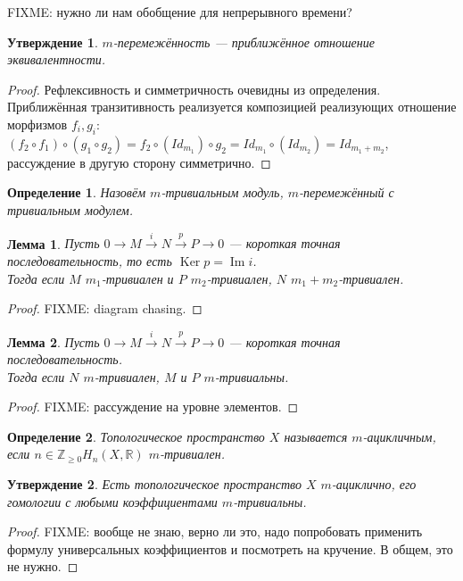 \documentclass[a4paper,12pt]{report}
\newtheorem{lemma}{Лемма}
\newtheorem{claim}{Утверждение}
\newtheorem{definition}{Определение}
\begin{document}
FIXME: нужно ли нам обобщение для непрерывного времени?
\begin{claim}
  $m$-перемежённость --- приближённое отношение эквивалентности.
\end{claim}
\begin{proof}
  Рефлексивность и симметричность очевидны из определения.\\
  Приближённая транзитивность реализуется композицией реализующих отношение морфизмов $f_i, g_i$:\\
  $(f_2 \circ f_1) \circ (g_1 \circ g_2) = f_2 \circ (Id_{m_1}) \circ g_2 = Id_{m_1} \circ (Id_{m_2}) = Id_{m_1 + m_2}$, рассуждение в другую сторону симметрично.
\end{proof}
\begin{definition}
  Назовём $m$-тривиальным модуль, $m$-перемежённый с тривиальным модулем.
\end{definition}
\begin{lemma}
  Пусть $0 \to M \xrightarrow{i} N \xrightarrow{p} P \to 0$ --- короткая точная последовательность, то есть $\operatorname{Ker}p = \operatorname{Im}i$.\\
  Тогда если $M$ $m_1$-тривиален и $P$ $m_2$-тривиален, $N$ $m_1 + m_2$-тривиален.
\end{lemma}
\begin{proof}
  FIXME: diagram chasing.
\end{proof}
\begin{lemma}
  Пусть $0 \to M \xrightarrow{i} N \xrightarrow{p} P \to 0$ --- короткая точная последовательность.\\
  Тогда если $N$ $m$-тривиален, $M$ и $P$ $m$-тривиальны.
\end{lemma}
\begin{proof}
  FIXME: рассуждение на уровне элементов.
\end{proof}
\begin{definition}
  Топологическое пространство $X$ называется $m$-ацикличным, если $n \in \mathbb{Z}_{\geq 0} H_n(X,\mathbb{R})$ $m$-тривиален.
\end{definition}
\begin{claim}
  Есть топологическое пространство $X$ $m$-ациклично, его гомологии с любыми коэффициентами $m$-тривиальны.
\end{claim}
\begin{proof}
  FIXME: вообще не знаю, верно ли это, надо попробовать применить формулу универсальных коэффициентов и посмотреть на кручение. В общем, это не нужно.
\end{proof}
\end{document}
